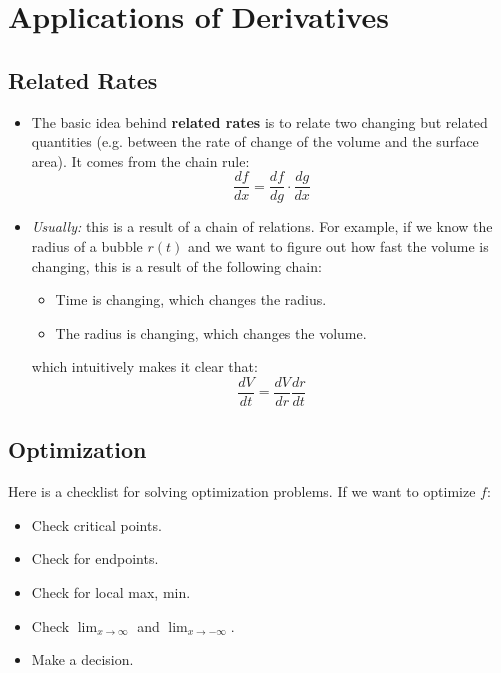 \documentclass{article}
\let\oldtextbf\textbf
\renewcommand{\textbf}[1]{\oldtextbf{#1}\index{#1}}
\begin{document}
\section{Applications of Derivatives}
\subsection{Related Rates}
\begin{itemize}
    \item The basic idea behind \textbf{related rates} is to relate two changing but related quantities (e.g. between the rate of change of the volume and the surface area). It comes from the chain rule:
    \begin{equation}
        \frac{df}{dx}=\frac{df}{dg} \cdot \frac{dg}{dx}
        \label{eq:}
    \end{equation}
    \item \textit{Usually:} this is a result of a chain of relations. For example, if we know the radius of a bubble $r(t)$ and we want to figure out how fast the volume is changing, this is a result of the following chain:
    \begin{itemize}
        \item Time is changing, which changes the radius.
        \item The radius is changing, which changes the volume.
    \end{itemize}
    which intuitively makes it clear that:
    \begin{equation}
        \frac{dV}{dt} = \frac{dV}{dr} \frac{dr}{dt}
        \label{eq:}
    \end{equation}
\end{itemize}
\subsection{Optimization}
Here is a checklist for solving optimization problems. If we want to optimize $f$:
\begin{itemize}
    \item Check critical points.
    \item Check for endpoints.
    \item Check for local max, min.
    \item Check $\lim_{x\to \infty}$ and $\lim_{x\to -\infty}$.
    \item Make a decision.
\end{itemize}
\end{document}

